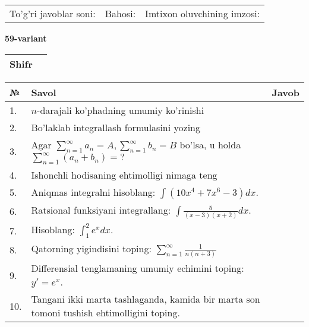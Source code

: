 \documentclass{article}
\begin{document}
  \vspace{1cm}
  
  \begin{tabular}{lll}
  To'g'ri javoblar soni: \underline{\hspace{1.5cm}} & 
  Bahosi: \underline{\hspace{1.5cm}} & 
  Imtixon oluvchining imzosi: \underline{\hspace{2cm}} \\
  \end{tabular}
  
  \egroup
  
  \newpage
  
  
  \textbf{59-variant}\\
  
  \bgroup
  \def\arraystretch{1.6} %
  
  \begin{tabular}{|m{5.7cm}|m{9.5cm}|}
  \hline
  Shifr & \\
  \hline
  \end{tabular}
  
  \vspace{1cm}
  
  \begin{tabular}{|m{0.7cm}|m{10cm}|m{4cm}|}
  \hline
  № & Savol & Javob \\
  \hline
  1. & \(n\)-darajali ko'phadning umumiy ko'rinishi &  \\
  \hline
  2. & Bo'laklab integrallash formulasini yozing &  \\
  \hline
  3. & Agar \(\sum_{n = 1}^{\infty}a_{n} = A,\sum_{n = 1}^{\infty}b_{n} = B\) bo'lsa, u holda \(\sum_{n = 1}^{\infty}\left( a_{n} + b_{n} \right) = ?\) &  \\
  \hline
  4. & Ishonchli hodisaning ehtimolligi nimaga teng &  \\
  \hline
  5. & Aniqmas integralni hisoblang: \(\int {\left( 10x^{4} + 7x^{6} - 3 \right)dx}\). &  \\
  \hline
  6. & Ratsional funksiyani integrallang: \(\int {\frac{5}{(x - 3)(x + 2)}dx}\). &  \\
  \hline
  7. & Hisoblang: \(\int_{1}^{2}{e^{x}dx}\). &  \\
  \hline
  8. & Qatorning yigindisini toping: \(\sum_{n = 1}^{\infty}\frac{1}{n(n + 3)}\) &  \\
  \hline
  9. & Differensial tenglamaning umumiy echimini toping: \(y' = e^{x}\). &  \\
  \hline
  10. & Tangani ikki marta tashlaganda, kamida bir marta son tomoni tushish ehtimolligini toping. &  \\
  \hline
  \end{tabular}
  
\end{document}
